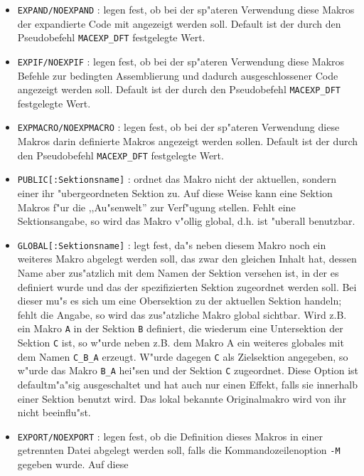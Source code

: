 \documentclass[12pt,a4paper,twoside]{report}
\newcommand{\tty}[1]{{\tt #1}}
\begin{document}
\begin{itemize}
\item{\tty{EXPAND/NOEXPAND} : legen fest, ob bei der sp"ateren
      Verwendung diese Makros der expandierte Code mit angezeigt
      werden soll.  Default ist der durch den Pseudobefehl
      \tty{MACEXP\_DFT} festgelegte Wert.}
\item{\tty{EXPIF/NOEXPIF} : legen fest, ob bei der sp"ateren
      Verwendung diese Makros Befehle zur bedingten Assemblierung
      und dadurch ausgeschlossener Code angezeigt werden soll.  Default
      ist der durch den Pseudobefehl \tty{MACEXP\_DFT} festgelegte Wert.}
\item{\tty{EXPMACRO/NOEXPMACRO} : legen fest, ob bei der sp"ateren
      Verwendung diese Makros darin definierte Makros angezeigt werden
      sollen.  Default ist der durch den Pseudobefehl
      \tty{MACEXP\_DFT} festgelegte Wert.}
\item{\tty{PUBLIC[:Sektionsname]} : ordnet das Makro nicht der
      aktuellen, sondern einer ihr "ubergeordneten Sektion zu.
      Auf diese Weise kann eine Sektion Makros f"ur die ,,Au"senwelt''
      zur Verf"ugung stellen.  Fehlt eine Sektionsangabe, so wird das
      Makro v"ollig global, d.h. ist "uberall benutzbar.}
\item{\tty{GLOBAL[:Sektionsname]} : legt fest, da"s neben diesem
      Makro noch ein weiteres Makro abgelegt werden soll, das zwar
      den gleichen Inhalt hat, dessen Name aber zus"atzlich mit dem
      Namen der Sektion versehen ist, in der es definiert wurde und
      das der spezifizierten Sektion zugeordnet werden soll.  Bei
      dieser mu"s es sich um eine Obersektion zu der aktuellen Sektion
      handeln; fehlt die Angabe, so wird das zus"atzliche Makro
      global sichtbar.  Wird z.B. ein Makro \tty{A} in der Sektion \tty{B}
      definiert, die wiederum eine Untersektion der Sektion \tty{C} ist,
      so w"urde neben z.B. dem Makro A ein weiteres globales mit dem
      Namen \tty{C\_B\_A} erzeugt.  W"urde dagegen \tty{C} als Zielsektion
      angegeben, so w"urde das Makro \tty{B\_A} hei"sen und der Sektion
      \tty{C} zugeordnet.  Diese Option ist defaultm"a"sig ausgeschaltet und
      hat auch nur einen Effekt, falls sie innerhalb einer Sektion
      benutzt wird.  Das lokal bekannte Originalmakro wird von ihr
      nicht beeinflu"st.}
\item{\tty{EXPORT/NOEXPORT} : legen fest, ob die Definition dieses
      Makros in einer getrennten Datei abgelegt werden soll, falls
      die Kommandozeilenoption \tty{-M} gegeben wurde.  Auf diese
}
\end{itemize}
\end{document}
